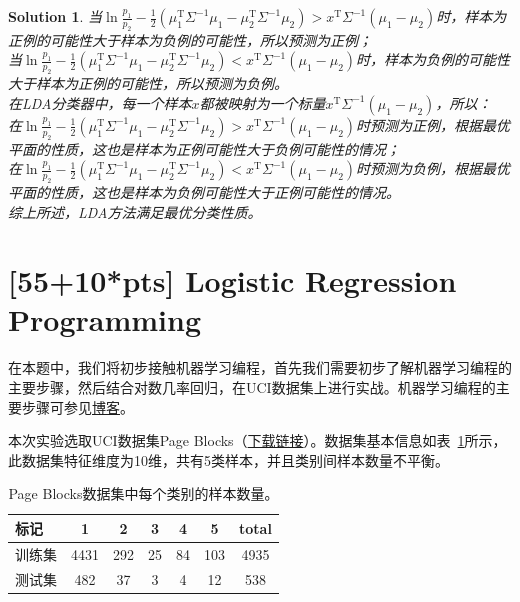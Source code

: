 \documentclass[a4paper,UTF8]{article}
\numberwithin{equation}{section}
\newtheorem*{solution}{Solution}
\begin{document}
\begin{solution}
当$\ln\frac{p_1}{p_2} - \frac{1}{2}(\mu_1^\mathrm{T}\Sigma^{-1}\mu_1 - \mu_2^\mathrm{T}\Sigma^{-1}\mu_2) > x^{\mathrm{T}}\Sigma^{-1}(\mu_1 - \mu_2)$时，样本为正例的可能性大于样本为负例的可能性，所以预测为正例；\\
当$\ln\frac{p_1}{p_2} - \frac{1}{2}(\mu_1^\mathrm{T}\Sigma^{-1}\mu_1 - \mu_2^\mathrm{T}\Sigma^{-1}\mu_2) < x^{\mathrm{T}}\Sigma^{-1}(\mu_1 - \mu_2)$时，样本为负例的可能性大于样本为正例的可能性，所以预测为负例。\\
在LDA分类器中，每一个样本$x$都被映射为一个标量$x^{\mathrm{T}}\Sigma^{-1}(\mu_1 - \mu_2)$，所以：\\
在$\ln\frac{p_1}{p_2} - \frac{1}{2}(\mu_1^\mathrm{T}\Sigma^{-1}\mu_1 - \mu_2^\mathrm{T}\Sigma^{-1}\mu_2) > x^{\mathrm{T}}\Sigma^{-1}(\mu_1 - \mu_2)$时预测为正例，根据最优平面的性质，这也是样本为正例可能性大于负例可能性的情况；\\
在$\ln\frac{p_1}{p_2} - \frac{1}{2}(\mu_1^\mathrm{T}\Sigma^{-1}\mu_1 - \mu_2^\mathrm{T}\Sigma^{-1}\mu_2) < x^{\mathrm{T}}\Sigma^{-1}(\mu_1 - \mu_2)$时预测为负例，根据最优平面的性质，这也是样本为负例可能性大于正例可能性的情况。\\
综上所述，LDA方法满足最优分类性质。
\end{solution}
\newpage



\section{[55+10*pts] Logistic Regression Programming}
在本题中，我们将初步接触机器学习编程，首先我们需要初步了解机器学习编程的主要步骤，然后结合对数几率回归，在UCI数据集上进行实战。机器学习编程的主要步骤可参见\href{http://blog.csdn.net/cqy_chen/article/details/78690975}{博客}。

本次实验选取UCI数据集Page Blocks（\href{http://lamda.nju.edu.cn/ml2018/PS2/PS2_dataset.zip}{下载链接}）。数据集基本信息如表~\ref{data_inf}所示，此数据集特征维度为10维，共有5类样本，并且类别间样本数量不平衡。

\begin{table}[!h]
	\centering
	\caption{Page Blocks数据集中每个类别的样本数量。}\vspace{3mm}
	\label{data_inf}
	\begin{tabular}{l|cccccc}\hline
		标记     & 1    & 2   & 3  & 4  & 5   & total \\ \hline
		训练集   & 4431 & 292 & 25 & 84 & 103 & 4935  \\
		测试集   & 482  & 37  & 3  & 4  & 12  & 538   \\ \hline
	\end{tabular}
\end{table}
\end{document}
